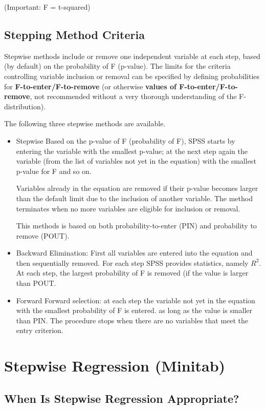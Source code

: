 (Important: F = t-squared)

\subsection{Stepping Method Criteria}
Stepwise methods include or remove one independent variable at each step, based (by default) on the probability of F (p-value). The limits for the criteria controlling variable inclusion or removal can be specified by defining probabilities for \textbf{F-to-enter/F-to-remove} (or otherwise \textbf{values of F-to-enter/F-to-remove}, not recommended without a very thorough understanding of the F-distribution).




The following three stepwise methods are available.

\begin{itemize}
\item Stepwise Based on the p-value of F (probability of F), SPSS starts by entering the variable with the smallest p-value; at the next step again the variable (from the list of variables not yet in the equation) with the smallest p-value for F and so on. 
    
    Variables already in the equation are removed if their p-value becomes larger than the default limit due to the inclusion of another variable. The method terminates when no more variables are eligible for inclusion or removal.	
    
    This methods is based on both probability-to-enter (PIN) and probability to remove (POUT).
\item Backward Elimination: First all variables are entered into the equation and then sequentially removed. For each step SPSS provides statistics, namely $R^2$. At each step, the largest probability of F is removed (if the value is larger than POUT.
\item Forward Forward selection: at each step the variable not yet in the equation with the smallest probability of F is entered. as long as the value is smaller than PIN. The procedure stops when there are no variables that meet the entry criterion.
\end{itemize}
\newpage
\section{Stepwise Regression (Minitab)}

\subsection*{When Is Stepwise Regression Appropriate?}


